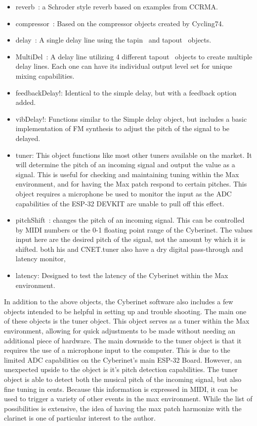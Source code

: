 \begin{itemize}
    \item reverb~: a Schroder style reverb based on examples from CCRMA.
    \item compressor~: Based on the compressor objects created by Cycling74.
    \item delay~: A single delay line using the tapin~ and tapout~ objects. 
    \item MultiDel~: A delay line utilizing 4 different tapout~ objects to create multiple delay lines. Each one can have its individual output level set for unique mixing capabilities.
    \item feedbackDelay!: Identical to the simple delay, but with a feedback option added.
    \item vibDelay!: Functions similar to the Simple delay object, but includes a basic implementation of FM synthesis to adjust the pitch of the signal to be delayed. 
    \item tuner: This object functions like most other tuners available on the market. It will determine the pitch of an incoming signal and output the value as a signal. This is useful for checking and maintaining tuning within the Max environment, and for having the Max patch respond to certain pitches. This object requires a microphone be used to monitor the input as the ADC capabilities of the ESP-32 DEVKIT are unable to pull off this effect.
    \item pitchShift~: changes the pitch of an incoming signal. This can be controlled by MIDI  numbers or the 0-1 floating point range of the Cyberinet. The values input here are the desired pitch of the signal, not the amount by which it is shifted. both his and CNET.tuner also have a dry digital pass-through and latency monitor,
    \item latency: Designed to test the latency of the Cyberinet within  the Max environment.
\end{itemize}

In addition to the above objects, the Cyberinet software also includes a few objects intended to be helpful in setting up and trouble shooting. The main one of these objects is the tuner object. This object serves as a tuner within the Max environment, allowing for quick adjustments to be made without needing an additional piece of hardware. 
The main downside to the tuner object is that it requires the use of a microphone input to the computer. This is due to the limited ADC capabilities on the Cyberinet's main ESP-32 Board. However, an unexpected upside to the object is it's pitch detection capabilities. The tuner object is able to detect both the musical pitch of the incoming signal, but also fine tuning in cents. Because this information is expressed in MIDI, it can be used to trigger a variety of other events in the max environment. While the list of possibilities is extensive, the idea of having the max patch harmonize with the clarinet is one of particular interest to the author.

